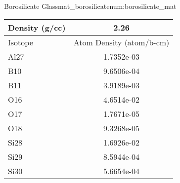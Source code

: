 \begin{matitem}{Borosilicate Glass}{mat_borosilicate}{num:borosilicate_mat}
  \centering
  \begin{tabular}{l c}
    \toprule
    Density (g/cc) & 2.26 \\
    \midrule
    Isotope & Atom Density (atom/b-cm) \\
    \midrule
    \midrule
Al27 & 1.7352e-03 \\
B10 & 9.6506e-04 \\
B11 & 3.9189e-03 \\
O16 & 4.6514e-02 \\
O17 & 1.7671e-05 \\
O18 & 9.3268e-05 \\
Si28 & 1.6926e-02 \\
Si29 & 8.5944e-04 \\
Si30 & 5.6654e-04 \\

    \bottomrule
  \end{tabular}
\end{matitem}
